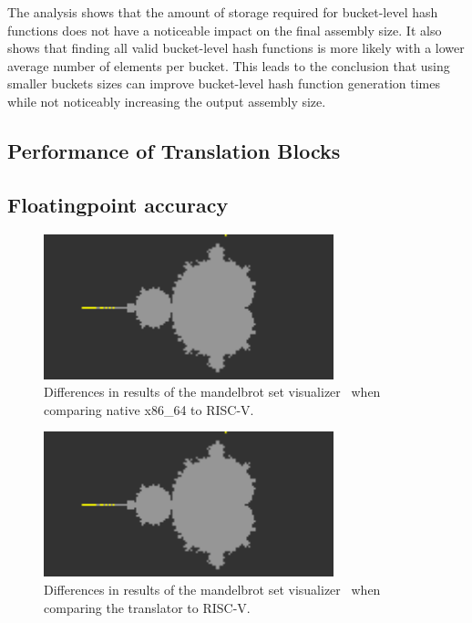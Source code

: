 \documentclass[course=eragp]{aspdoc}
\begin{document}
\par

The analysis shows that
the amount of storage required for bucket-level hash functions does not have a noticeable impact on
the final assembly size. It also shows that finding all valid bucket-level hash functions is more
likely with a lower average number of elements per bucket. This leads to the conclusion that using
smaller buckets sizes can improve bucket-level hash function generation times while not noticeably
increasing the output assembly size.

\subsection{Performance of Translation Blocks}

\subsection{Floatingpoint accuracy}
\begin{figure}[H]
    \centering
    \includegraphics[width=0.75\textwidth]{images/mandelbrot_differences/x86_diff.png}
    \caption{Differences in results of the mandelbrot set visualizer~\cite{mandelbrot_program} when
        comparing native x86\_64 to RISC-V.}\label{fig:mandelbrot_diff_native_x86}
\end{figure}

\begin{figure}[H]
    \centering
    \includegraphics[width=0.75\textwidth]{images/mandelbrot_differences/translated_diff.png}
    \caption{Differences in results of the mandelbrot set visualizer~\cite{mandelbrot_program} when
        comparing the translator to RISC-V.}\label{fig:mandelbrot_diff_translator}
\end{figure}
\end{document}
